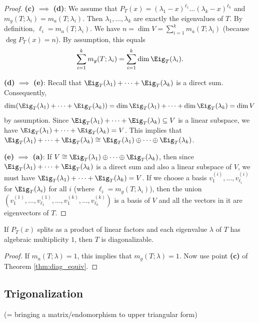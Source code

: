 \begin{proof}
  \textbf{(c)} $\implies$ \textbf{(d)}: We assume that $P_T(x) = (\lambda_1 - x)^{\ell_1} \dots (\lambda_k - x)^{\ell_k}$ and $m_g(T; \lambda_i) = m_a(T; \lambda_i)$.
  Then $\lambda_1, \dots, \lambda_k$ are exactly the eigenvalues of $T$. By definition, $\ell_i = m_a(T; \lambda_i)$.
  We have $n = \dim V = \sum_{i=1}^k m_a(T; \lambda_i)$ (because $\deg P_T(x) = n$).
  By assumption, this equals \[ \sum_{i=1}^k m_g(T; \lambda_i) = \sum_{i=1}^k \dim \Eig_T(\lambda_i). \]

  \textbf{(d)} $\implies$ \textbf{(e)}: Recall that $\Eig_T(\lambda_1) + \dots + \Eig_T(\lambda_k)$ is a direct sum.
  Consequently, \[ \dim(\Eig_T(\lambda_1) + \dots + \Eig_T(\lambda_k)) = \dim \Eig_T(\lambda_1) + \dots + \dim \Eig_T(\lambda_k) = \dim V \] by assumption.
  Since $\Eig_T(\lambda_1) + \dots + \Eig_T(\lambda_k) \subseteq V$ is a linear subspace, we have $\Eig_T(\lambda_1) + \dots + \Eig_T(\lambda_k) = V$.
  This implies that $\Eig_T(\lambda_1) + \dots + \Eig_T(\lambda_k) \cong \Eig_T(\lambda_1) \oplus \dots \oplus \Eig_T(\lambda_k)$.

  \textbf{(e)} $\implies$ \textbf{(a)}: If $V \cong \Eig_T(\lambda_1) \oplus \dots \oplus \Eig_T(\lambda_k)$, then since $\Eig_T(\lambda_1) + \dots + \Eig_T(\lambda_k)$ is a direct sum and also a linear subspace of $V$, we must have $\Eig_T(\lambda_1) + \dots + \Eig_T(\lambda_k) = V$.
  If we choose a basis $v_1^{(i)}, \dots, v_{\ell_i}^{(i)}$ for $\Eig_T(\lambda_i)$ for all $i$ (where $\ell_i = m_g(T; \lambda_i)$), then the union $(v_1^{(1)}, \dots, v_{\ell_1}^{(1)}, \dots, v_1^{(k)}, \dots, v_{\ell_k}^{(k)})$ is a basis of $V$ and all the vectors in it are eigenvectors of $T$.
\end{proof}

\begin{corollary}\label{cor:sufficient_diag}
  If $P_T(x)$ splits as a product of linear factors and each eigenvalue $\lambda$ of $T$ has algebraic multiplicity $1$, then $T$ is diagonalizable.
\end{corollary}

\begin{proof}
  If $m_a(T; \lambda) = 1$, this implies that $m_g(T; \lambda) = 1$. Now use point \textbf{(c)} of Theorem \ref{thm:diag_equiv}.
\end{proof}



\subsection{Trigonalization}
(= bringing a matrix/endomorphism to upper triangular form)

